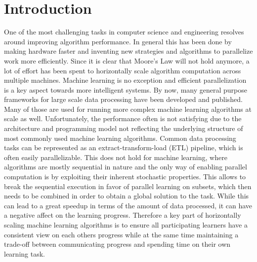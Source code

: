 
\chapter{Introduction}
One of the most challenging tasks in computer science and engineering resolves around improving algorithm performance.
In general this has been done by making hardware faster and inventing new strategies and algorithms to parallelize work more efficiently.
Since it is clear that Moore's Law will not hold anymore, a lot of effort has been spent to horizontally scale algorithm computation across multiple machines.
Machine learning is no exception and efficient parallelization is a key aspect towards more intelligent systems.
By now, many general purpose frameworks for large scale data processing have been developed and published. Many of those are used for running more complex machine learning algorithms at scale as well.
Unfortunately, the performance often is not satisfying due to the architecture and programming model not reflecting the underlying structure of most commonly used machine learning algorithms.
Common data processing tasks can be represented as an extract-transform-load (ETL) pipeline, which is often easily parallelizable. This does not hold for machine learning, where algorithms are mostly sequential in nature and the only way of enabling parallel computation is by exploiting their inherent stochastic properties. This allows to break the sequential execution in favor of parallel learning on subsets, which then needs to be combined in order to obtain a global solution to the task.
While this can lead to a great speedup in terms of the amount of data processed, it can have a negative affect on the learning progress.
Therefore a key part of horizontally scaling machine learning algorithms is to ensure all participating learners have a consistent view on each others progress while at the same time maintaining a trade-off between communicating progress and spending time on their own learning task.


